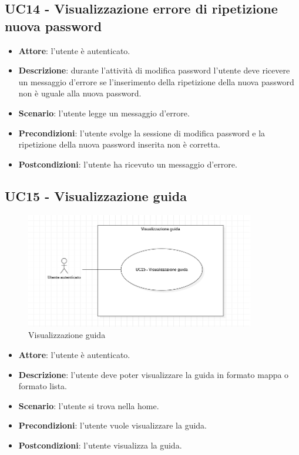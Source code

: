 \subsection{UC14 - Visualizzazione errore di ripetizione nuova password}
\begin{itemize}
    \item \textbf{Attore}: l'utente è autenticato.
    \item \textbf{Descrizione}: durante l'attività di modifica password l'utente deve ricevere un messaggio d'errore se l'inserimento della ripetizione della nuova password non è uguale alla nuova password.
    \item \textbf{Scenario}: l'utente legge un messaggio d'errore. 
    \item \textbf{Precondizioni}: l'utente svolge la sessione di modifica password e la ripetizione della nuova password inserita non è corretta.
    \item \textbf{Postcondizioni}: l'utente ha ricevuto un messaggio d'errore.
\end{itemize}

\subsection{UC15 - Visualizzazione guida}

\begin{figure}[H]
    \includegraphics[width=10cm]{sezioni/Images/UC15.png}
    \centering
    \caption{Visualizzazione guida}
\end{figure}

\begin{itemize}
    \item \textbf{Attore}: l'utente è autenticato.
    \item \textbf{Descrizione}: l'utente deve poter visualizzare la guida in formato mappa o formato lista.
    \item \textbf{Scenario}: l'utente si trova nella home.
    \item \textbf{Precondizioni}: l'utente vuole visualizzare la guida.
    \item \textbf{Postcondizioni}: l'utente visualizza la guida.
\end{itemize}

